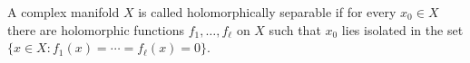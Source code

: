 A complex manifold $X$ is called holomorphically separable if for every $x_0 \in X$ there are holomorphic functions $f_1, \ldots, f_\ell$ on $X$ such that $x_0$ lies isolated in the set $\{x \in X : f_1(x) = \cdots = f_\ell(x) = 0\}$.
